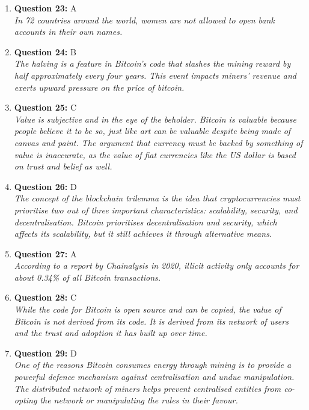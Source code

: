 \documentclass[12pt,a4paper]{article}
\begin{document}
\begin{enumerate}
\item \textbf{Question 23:} A
\\ \textit{In 72 countries around the world, women are not allowed to open 
bank accounts in their own names.}

\item \textbf{Question 24:} B
\\ \textit{The halving is a feature in Bitcoin's code that slashes the mining 
reward by half approximately every four years. This event impacts 
miners' revenue and exerts upward pressure on the price of bitcoin.}

\item \textbf{Question 25:} C
\\ \textit{Value is subjective and in the eye of the beholder. Bitcoin is valuable 
because people believe it to be so, just like art can be valuable despite 
being made of canvas and paint. The argument that currency must be backed by 
something of value is inaccurate, as the value of fiat currencies like the US 
dollar is based on trust and belief as well.}

\item \textbf{Question 26:} D
\\ \textit{The concept of the blockchain trilemma is the idea that cryptocurrencies 
must prioritise two out of three important characteristics: scalability, 
security, and decentralisation. Bitcoin prioritises decentralisation and security, 
which affects its scalability, but it still achieves it through alternative means.}

\item \textbf{Question 27:} A
\\ \textit{According to a report by Chainalysis in 2020, illicit activity only 
accounts for about 0.34\% of all Bitcoin transactions.}

\item \textbf{Question 28:} C
\\ \textit{While the code for Bitcoin is open source and can be copied, 
the value of Bitcoin is not derived from its code. It is derived from 
its network of users and the trust and adoption it has built up over time.}

\item \textbf{Question 29:} D
\\ \textit{One of the reasons Bitcoin consumes energy through mining is to 
provide a powerful defence mechanism against centralisation and 
undue manipulation. The distributed network of miners helps prevent 
centralised entities from co-opting the network or manipulating the rules in their favour.}


\end{enumerate}
\end{document}
